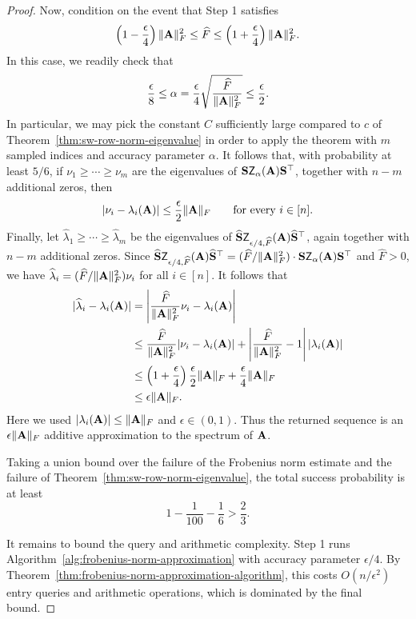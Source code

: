 \begin{proof}
Now, condition on the event that Step 1 satisfies
\[
    \left(1-\frac{\epsilon}{4}\right)\|\mathbf{A}\|_F^2
    \leq
    \widehat F
    \leq
    \left(1+\frac{\epsilon}{4}\right)\|\mathbf{A}\|_F^2.
\]
In this case, we readily check that
\[
    \frac{\epsilon}{8}\leq\alpha = \frac{\epsilon}{4}
    \sqrt{\frac{\widehat F}{\|\mathbf{A}\|_F^2}}\leq\frac{\epsilon}{2}.
\]
In particular, we may pick the constant $C$ sufficiently large compared to $c$ of Theorem~\ref{thm:sw-row-norm-eigenvalue} in order to apply the theorem with $m$ sampled indices and accuracy parameter $\alpha$. It follows that, with probability at least
\(5/6\), if
\(
    \nu_1\geq\cdots\geq\nu_m
\)
are the eigenvalues of \(\mathbf{S}\mathsf Z_{\alpha}(\mathbf{A})\mathbf{S}^\top\), together with \(n-m\)
additional zeros, then
\[
    |\nu_i-\lambda_i(\mathbf{A})|
    \leq
    \frac{\epsilon}{2}\|\mathbf{A}\|_F
    \qquad
    \text{for every } i\in[n].
\]
Finally, let
\(
\widehat\lambda_1\geq\cdots\geq\widehat\lambda_m
\)
be the eigenvalues of
\(\widehat {\mathbf{S}}\mathsf Z_{\epsilon/4,\widehat F}(\mathbf{A})\widehat {\mathbf{S}}^\top\),
again together with \(n-m\) additional zeros. Since
\(
    \widehat {\mathbf{S}}\mathsf Z_{\epsilon/4,\widehat F}(\mathbf{A})\widehat {\mathbf{S}}^\top
    =
    ({\widehat F}/{\|\mathbf{A}\|_F^2})\cdot 
    \mathbf{S}\mathsf Z_{\alpha}(\mathbf{A})\mathbf{S}^\top
\)
and \(\widehat F>0\), we have
\(
    \widehat\lambda_i
    =
    ({\widehat F}/{\|\mathbf{A}\|_F^2})\nu_i
\)
for all $i\in[n]$. It follows that
\begin{align*}
    |\widehat\lambda_i-\lambda_i(\mathbf{A})|
    &=
    \left|
        \frac{\widehat F}{\|\mathbf{A}\|_F^2}\nu_i
        -
        \lambda_i(\mathbf{A})
    \right| \\
    &\leq
    \frac{\widehat F}{\|\mathbf{A}\|_F^2}
    |\nu_i-\lambda_i(\mathbf{A})|
    +
    \left|
        \frac{\widehat F}{\|\mathbf{A}\|_F^2}-1
    \right|
    |\lambda_i(\mathbf{A})| \\
    &\leq
    \left(1+\frac{\epsilon}{4}\right)
    \frac{\epsilon}{2}\|\mathbf{A}\|_F
    +
    \frac{\epsilon}{4}\|\mathbf{A}\|_F \\
    &\leq
    \epsilon\|\mathbf{A}\|_F.
\end{align*}
Here we used
\(
    |\lambda_i(\mathbf{A})|
    \leq
    \|\mathbf{A}\|_F
\)
and \(\epsilon\in(0,1)\). Thus the returned sequence is an
\(\epsilon\|\mathbf{A}\|_F\) additive approximation to the spectrum of \(\mathbf{A}\).

Taking a union bound over the failure of the Frobenius norm estimate and
the failure of Theorem~\ref{thm:sw-row-norm-eigenvalue}, the total success
probability is at least
\[
    1-\frac{1}{100}-\frac{1}{6}
    >
    \frac{2}{3}.
\]


It remains to bound the query and arithmetic complexity. Step 1 runs
Algorithm~\ref{alg:frobenius-norm-approximation} with accuracy parameter
\(\epsilon/4\). By Theorem~\ref{thm:frobenius-norm-approximation-algorithm},
this costs
\(
    O\left({n}/{\epsilon^2}\right)
\)
entry queries and arithmetic operations, which is dominated by the final
bound.


\end{proof}
